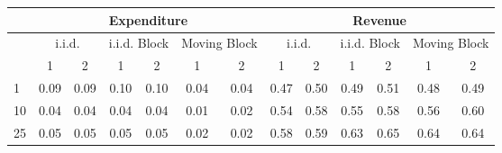 %

\begin{tabular}{@{}lcccccccccccc@{}}
	\toprule
	& \multicolumn{6}{c}{ Expenditure } & \multicolumn{6}{c}{ Revenue } \\ \hline
	& \multicolumn{2}{c}{ i.i.d.} & \multicolumn{2}{c}{ i.i.d. Block } & \multicolumn{2}{c}{ Moving Block } & \multicolumn{2}{c}{ i.i.d.} & \multicolumn{2}{c}{ i.i.d. Block } & \multicolumn{2}{c}{ Moving Block } \\
	\hline
	\diagbox{$\tau$}{$q$} & 1 & 2 & 1 & 2 & 1 & 2 & 1 & 2 & 1 & 2 & 1 & 2 \\
	\hline
	1  & 0.09 & 0.09 & 0.10 & 0.10 & 0.04 & 0.04 & 0.47 & 0.50 & 0.49 & 0.51 & 0.48 & 0.49\\
	10 & 0.04 & 0.04 & 0.04 & 0.04 & 0.01 & 0.02 & 0.54 & 0.58 & 0.55 & 0.58 & 0.56 & 0.60 \\
	25 & 0.05 & 0.05 & 0.05 & 0.05 & 0.02 & 0.02 & 0.58 & 0.59 & 0.63 & 0.65 & 0.64 & 0.64 \\
	\bottomrule
\end{tabular}
